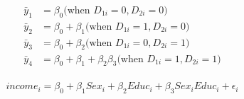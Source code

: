 \documentclass[12pt]{amsart}
\begin{document}
\begin{equation}
\begin{split}
\bar{y}_1 &= \beta_0 \text{(when } D_{1i}=0, D_{2i}=0 \textbf{)} \\
\bar{y}_2 &= \beta_0 + \beta_1 \text{(when } D_{1i} = 1, D_{2i} = 0 \textbf{)} \\
\bar{y}_3 &= \beta_0 + \beta_2 \text{(when } D_{1i} = 0, D_{2i} = 1 \textbf{)} \\
\bar{y}_4 &= \beta_0 + \beta_1 + \beta_2 \beta_3 \text{(when } D_{1i} = 1, D_{2i} = 1 \textbf{)} \\
\end{split}
\end{equation}

\begin{equation}
income_i = \beta_0 + \beta_1 Sex_i + \beta_2 Educ_i + \beta_3 Sex_i Educ_i + \epsilon_i
\end{equation}
\end{document}
